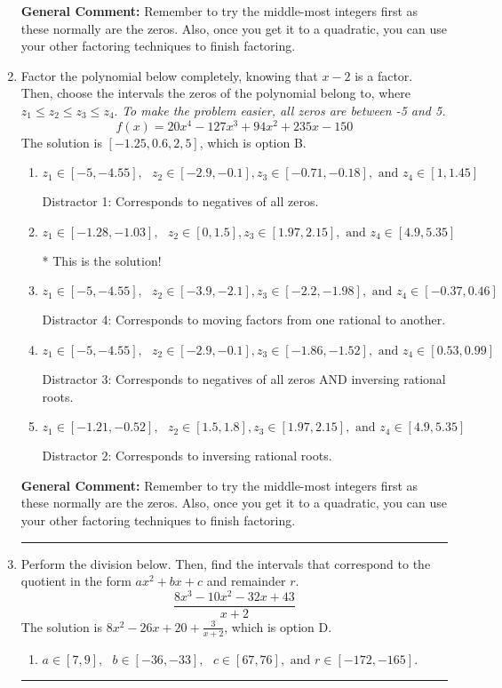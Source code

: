 \documentclass{extbook}[14pt]
\newcommand{\litem}[1]{\item #1

\rule{\textwidth}{0.4pt}}
\begin{document}
\begin{enumerate}
{\textbf{General Comment:} Remember to try the middle-most integers first as these normally are the zeros. Also, once you get it to a quadratic, you can use your other factoring techniques to finish factoring.
}
\litem{
Factor the polynomial below completely, knowing that $x -2$ is a factor. Then, choose the intervals the zeros of the polynomial belong to, where $z_1 \leq z_2 \leq z_3 \leq z_4$. \textit{To make the problem easier, all zeros are between -5 and 5.}
\[ f(x) = 20x^{4} -127 x^{3} +94 x^{2} +235 x -150 \]The solution is \( [-1.25, 0.6, 2, 5] \), which is option B.\begin{enumerate}[label=\Alph*.]
\item \( z_1 \in [-5, -4.55], \text{   }  z_2 \in [-2.9, -0.1], z_3 \in [-0.71, -0.18], \text{   and   } z_4 \in [1, 1.45] \)

 Distractor 1: Corresponds to negatives of all zeros.
\item \( z_1 \in [-1.28, -1.03], \text{   }  z_2 \in [0, 1.5], z_3 \in [1.97, 2.15], \text{   and   } z_4 \in [4.9, 5.35] \)

* This is the solution!
\item \( z_1 \in [-5, -4.55], \text{   }  z_2 \in [-3.9, -2.1], z_3 \in [-2.2, -1.98], \text{   and   } z_4 \in [-0.37, 0.46] \)

 Distractor 4: Corresponds to moving factors from one rational to another.
\item \( z_1 \in [-5, -4.55], \text{   }  z_2 \in [-2.9, -0.1], z_3 \in [-1.86, -1.52], \text{   and   } z_4 \in [0.53, 0.99] \)

 Distractor 3: Corresponds to negatives of all zeros AND inversing rational roots.
\item \( z_1 \in [-1.21, -0.52], \text{   }  z_2 \in [1.5, 1.8], z_3 \in [1.97, 2.15], \text{   and   } z_4 \in [4.9, 5.35] \)

 Distractor 2: Corresponds to inversing rational roots.
\end{enumerate}

\textbf{General Comment:} Remember to try the middle-most integers first as these normally are the zeros. Also, once you get it to a quadratic, you can use your other factoring techniques to finish factoring.
}
\litem{
Perform the division below. Then, find the intervals that correspond to the quotient in the form $ax^2+bx+c$ and remainder $r$.
\[ \frac{8x^{3} -10 x^{2} -32 x + 43}{x + 2} \]The solution is \( 8x^{2} -26 x + 20 + \frac{3}{x + 2} \), which is option D.\begin{enumerate}[label=\Alph*.]
\item \( a \in [7, 9], \text{   } b \in [-36, -33], \text{   } c \in [67, 76], \text{   and   } r \in [-172, -165]. \)


\end{enumerate}}
\end{enumerate}
\end{document}

